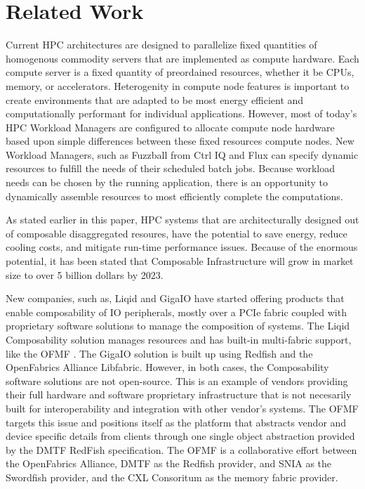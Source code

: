 \section{Related Work}
Current HPC architectures are designed to parallelize fixed quantities of homogenous commodity servers that are implemented as compute hardware.  Each compute server is a fixed quantity of preordained resources, whether it be CPUs, memory, or accelerators.  Heterogenity in compute node features is important to create environments that are adapted to be most energy efficient and computationally performant for individual applications.  However, most of today's HPC Workload Managers are configured to allocate compute node hardware based upon simple differences between these fixed resources compute nodes.  New Workload Managers, such as Fuzzball from Ctrl IQ \cite{fuzzball} and Flux \cite{flux} can specify dynamic resources to fulfill the needs of their scheduled batch jobs. Because workload needs can be chosen by the running application, there is an opportunity to dynamically assemble resources to most efficiently complete the computations.
 
As stated earlier in this paper, HPC systems that are architecturally designed out of composable disaggregated resoures, have the potential to save energy, reduce cooling costs, and mitigate run-time performance issues. Because of the enormous potential, it has been stated that Composable Infrastructure will grow in market size to over 5 billion dollars by 2023\cite{rlinker}.

New companies, such as, Liqid \cite{liqid} and GigaIO \cite{gigaio}  have started offering products that enable composability of IO peripherals, mostly over a PCIe fabric coupled with proprietary software solutions to manage the composition of systems. The Liqid Composability solution manages resources and has built-in multi-fabric support, like the OFMF \cite{liqidmf}. The GigaIO solution is built up using Redfish and the OpenFabrics Alliance Libfabric.  However, in both cases, the Composability software solutions are not open-source. This is an example of vendors providing their full hardware and software proprietary infrastructure that is not necesarily built for interoperability and integration with other vendor's systems.
The OFMF targets this issue and positions itself as the platform that abstracts vendor and device specific details from clients through one single object abstraction provided by the DMTF RedFish specification. The OFMF is a collaborative effort between the OpenFabrics Alliance, DMTF as the Redfish provider, and SNIA as the Swordfish provider, and the CXL Consoritum as the memory fabric provider.








 
